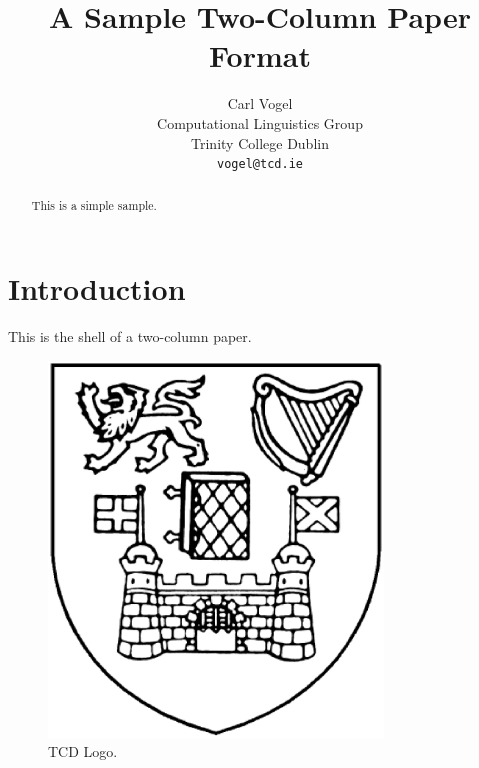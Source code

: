 \documentclass[10pt,twocolumn]{article}
\begin{document}
\title{A Sample Two-Column Paper Format}

\author{Carl Vogel \\
Computational Linguistics Group  \\
Trinity College Dublin \\
{\tt vogel@tcd.ie}}

\maketitle
\thispagestyle{empty}

\begin{abstract}
   This is a simple sample.
\end{abstract}

\section{Introduction}

This is the shell of a two-column paper.



\begin{figure}[hbt]
  \begin{center}
    \includegraphics[width=3.5in]{figure.eps}
  \end{center}
  \caption{\small TCD Logo.}
  \label{f:s}
\end{figure}
\end{document}
